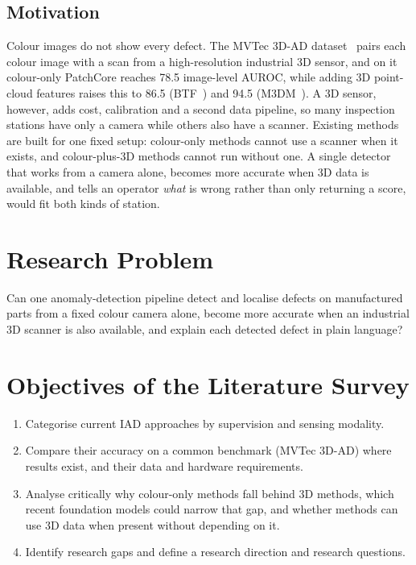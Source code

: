 \documentclass[conference]{IEEEtran}
\begin{document}
\subsection{Motivation}
Colour images do not show every defect. The MVTec 3D-AD dataset~\cite{mvtec3d} pairs each colour image with a scan from a high-resolution industrial 3D sensor, and on it colour-only PatchCore reaches 78.5 image-level AUROC, while adding 3D point-cloud features raises this to 86.5 (BTF~\cite{btf}) and 94.5 (M3DM~\cite{m3dm}). A 3D sensor, however, adds cost, calibration and a second data pipeline, so many inspection stations have only a camera while others also have a scanner. Existing methods are built for one fixed setup: colour-only methods cannot use a scanner when it exists, and colour-plus-3D methods cannot run without one. A single detector that works from a camera alone, becomes more accurate when 3D data is available, and tells an operator \emph{what} is wrong rather than only returning a score, would fit both kinds of station.

\section{Research Problem}
Can one anomaly-detection pipeline detect and localise defects on manufactured parts from a fixed colour camera alone, become more accurate when an industrial 3D scanner is also available, and explain each detected defect in plain language?

\section{Objectives of the Literature Survey}
\begin{enumerate}
\item Categorise current IAD approaches by supervision and sensing modality.
\item Compare their accuracy on a common benchmark (MVTec 3D-AD) where results exist, and their data and hardware requirements.
\item Analyse critically why colour-only methods fall behind 3D methods, which recent foundation models could narrow that gap, and whether methods can use 3D data when present without depending on it.
\item Identify research gaps and define a research direction and research questions.
\end{enumerate}
\end{document}
